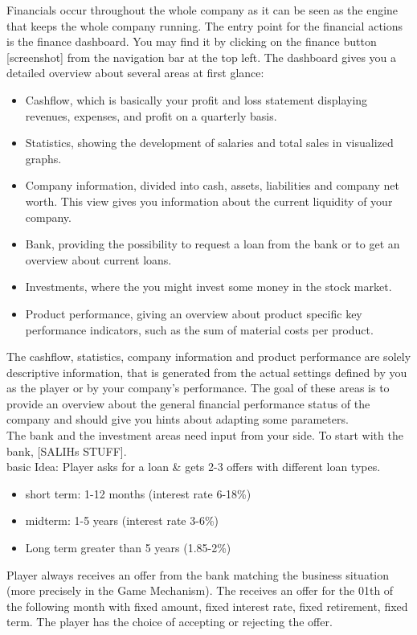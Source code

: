 \documentclass[11pt,titlepage,oneside,openany]{book}
\begin{document}
Financials occur throughout the whole company as it can be seen as the engine that keeps the whole company running. The entry point for the financial actions is the finance dashboard. You may find it by clicking on the finance button [screenshot] from the navigation bar at the top left. The dashboard gives you a detailed overview about several areas at first glance:

\begin{itemize}
    \item Cashflow, which is basically your profit and loss statement displaying revenues, expenses, and profit on a quarterly basis.
    \item Statistics, showing the development of salaries and total sales in visualized graphs.
    \item Company information, divided into cash, assets, liabilities and company net worth. This view gives you information about the current liquidity of your company.
    \item Bank, providing the possibility to request a loan from the bank or to get an overview about current loans.
    \item Investments, where the you might invest some money in the stock market.
    \item Product performance, giving an overview about product specific key performance indicators, such as the sum of material costs per product.
\end{itemize}

The cashflow, statistics, company information and product performance are solely descriptive information, that is generated from the actual settings defined by you as the player or by your company’s performance. The goal of these areas is to provide an overview about the general financial performance status of the company and should give you hints about adapting some parameters. \\
The bank and the investment areas need input from your side. To start with the bank, [SALIHs STUFF].\\
basic Idea: Player asks for a loan \& gets 2-3 offers with different loan types. 
\begin{itemize}
    \item short term: 1-12 months (interest rate 6-18\%)
    \item midterm: 1-5 years (interest rate 3-6\%)
    \item Long term greater than 5 years (1.85-2\%)
\end{itemize}
Player always receives an offer from the bank matching the business situation (more precisely in the Game Mechanism). The receives an offer for the 01th of the following month with fixed amount, fixed interest rate, fixed retirement, fixed term.
The player has the choice of accepting or rejecting the offer.\\
\end{document}
